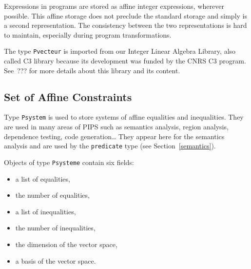 \documentclass[a4paper]{article}
\begin{document}
Expressions in programs are stored as affine integer expressions,
wherever possible. This affine storage does not preclude the standard
storage and simply is a second representation. The consistency between
the two representations is hard to maintain, especially during program
transformations.

\begin{comment}
Les expressions apparaissant dans le programme analys� sont mises
sous cette forme quand c'est possible.
\end{comment}

The type \texttt{Pvecteur} is imported from our Integer Linear Algebra
Library, also called C3 library because its development was funded by
the CNRS C3 program. See~??? for more details about this library and its
content.

\begin{comment}
La structure de donn�es Pvecteur est import�e de la biblioth�que d'alg�bre
lin�aire en nombres entiers du CRI.
\end{comment}

\subsection{Set of Affine Constraints}
\label{subsection-psysteme}

{}

Type \texttt{Psystem} is used to store systems of affine equalities and
inequalities. They are used in many areas of PIPS such as semantics
analysis, region analysis, dependence testing, code generation\ldots 
They appear here for the semantics analysis and are used by the 
\texttt{predicate} type (see Section~\ref{semantics}).

\begin{comment}
Le domaine \texttt{Psysteme} est utilis� pour repr�senter les syst�mes
d'�quations et d'in�quations lin�aires qui apparaissent lors
de la phase d'analyse s�mantique (voir le domaine \texttt{predicate}).

Les Psystemes sont aussi implicitement utilis�s pour effectuer le
calcul de d�pendance.
\end{comment}

Objects of type \texttt{Psysteme} contain six fields:

\begin{itemize}
  \item a list of equalities,
  \item the number of equalities,
  \item a list of inequalities,
  \item the number of inequalities,
  \item the dimension of the vector space,
  \item a basis of the vector space.
\end{itemize}
\end{document}
